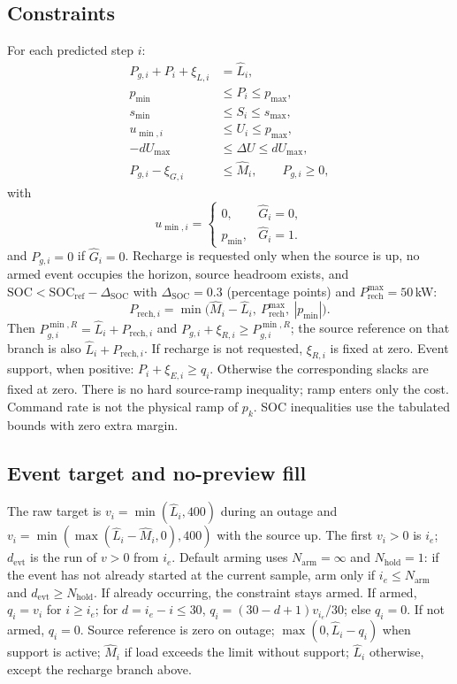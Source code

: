 \documentclass{ieeeaccess}
\begin{document}
\subsection{Constraints}
For each predicted step $i$:
\begin{align}
P_{g,i}+P_i+\xi_{L,i}&=\widehat L_i,\\
p_{\min}&\le P_i\le p_{\max},\\
s_{\min}&\le S_i\le s_{\max},\\
u_{\min,i}&\le U_i\le p_{\max},\\
-dU_{\max}&\le\Delta U\le dU_{\max},\\
P_{g,i}-\xi_{G,i}&\le\widehat M_i,\qquad P_{g,i}\ge 0,
\end{align}
with
\begin{equation}
u_{\min,i}
=\begin{cases}
0, & \widehat{G}_i=0,\\
p_{\min}, & \widehat{G}_i=1.
\end{cases}
\end{equation}
and $P_{g,i}=0$ if $\widehat{G}_i=0$. Recharge is requested only when the source is up, no armed event occupies the horizon, source headroom exists, and $\mathrm{SOC}<\mathrm{SOC}_{\mathrm{ref}}-\Delta_{\mathrm{SOC}}$ with $\Delta_{\mathrm{SOC}}=0.3$ (percentage points) and $P_{\mathrm{rech}}^{\max}=50$\,kW:
\begin{equation}
P_{\mathrm{rech},i}
=\min\!\big(\widehat M_i-\widehat L_i,\ P_{\mathrm{rech}}^{\max},\ |p_{\min}|\big).
\end{equation}
Then $P_{g,i}^{\min,R}=\widehat L_i+P_{\mathrm{rech},i}$ and $P_{g,i}+\xi_{R,i}\ge P_{g,i}^{\min,R}$; the source reference on that branch is also $\widehat L_i+P_{\mathrm{rech},i}$. If recharge is not requested, $\xi_{R,i}$ is fixed at zero. Event support, when positive: $P_i+\xi_{E,i}\ge q_i$. Otherwise the corresponding slacks are fixed at zero. There is no hard source-ramp inequality; ramp enters only the cost. Command rate is not the physical ramp of $p_k$. SOC inequalities use the tabulated bounds with zero extra margin.

\subsection{Event target and no-preview fill}
The raw target is $v_i=\min(\widehat L_i,400)$ during an outage and $v_i=\min(\max(\widehat L_i-\widehat M_i,0),400)$ with the source up. The first $v_i>0$ is $i_e$; $d_{\mathrm{evt}}$ is the run of $v>0$ from $i_e$. Default arming uses $N_{\mathrm{arm}}=\infty$ and $N_{\mathrm{hold}}=1$: if the event has not already started at the current sample, arm only if $i_e\le N_{\mathrm{arm}}$ and $d_{\mathrm{evt}}\ge N_{\mathrm{hold}}$. If already occurring, the constraint stays armed. If armed, $q_i=v_i$ for $i\ge i_e$; for $d=i_e-i\le 30$, $q_i=(30-d+1)v_{i_e}/30$; else $q_i=0$. If not armed, $q_i=0$. Source reference is zero on outage; $\max(0,\widehat L_i-q_i)$ when support is active; $\widehat M_i$ if load exceeds the limit without support; $\widehat L_i$ otherwise, except the recharge branch above.
\end{document}
